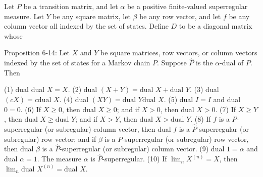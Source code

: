 Let $P$ be a transition matrix, and let $\alpha$ be a positive finite-valued superregular measure. Let $Y$ be any square matrix, let $\beta$ be any row vector, and let $f$ be any column vector all indexed by the set of states. Define $D$ to be a diagonal matrix whose

Proposition 6-14: Let $X$ and $Y$ be square matrices, row vectors, or column vectors indexed by the set of states for a Markov chain $P$. Suppose $\hat{P}$ is the $\alpha$-dual of $P$. Then

(1) dual dual $X = X$.
(2) dual $(X + Y) = \text{dual } X + \text{dual } Y$.
(3) dual $(cX) = c \text{dual } X$.
(4) dual $(XY) = \text{dual } Y \text{dual } X$.
(5) dual $I = I$ and dual $0 = 0$.
(6) If $X \geq 0$, then dual $X \geq 0$; and if $X > 0$, then dual $X > 0$.
(7) If $X \geq Y$, then dual $X \geq \text{dual } Y$; and if $X > Y$, then dual $X > \text{dual } Y$.
(8) If $f$ is a $P$-superregular (or subregular) column vector, then dual $f$ is a $\hat{P}$-superregular (or subregular) row vector; and if $\beta$ is a $P$-superregular (or subregular) row vector, then dual $\beta$ is a $\hat{P}$-superregular (or subregular) column vector.
(9) dual $1 = \alpha$ and dual $\alpha = 1$. The measure $\alpha$ is $\hat{P}$-superregular.
(10) If $\lim_n X^{(n)} = X$, then $\lim_n \text{dual } X^{(n)} = \text{dual } X$.
